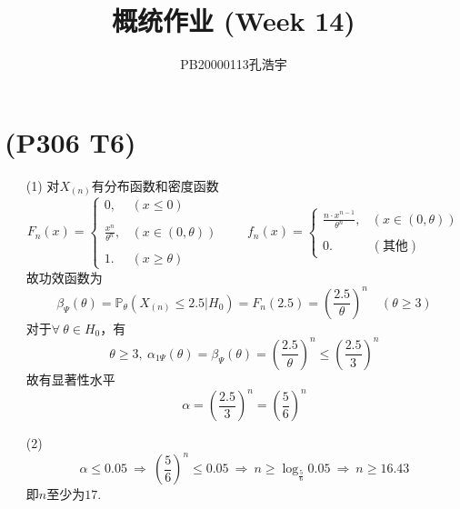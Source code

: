 \documentclass{article}
\title{概统作业 (Week 14)}
\author{PB20000113孔浩宇}
\begin{document}
\maketitle
\section{(P306 T6)}  %
\begin{enumerate}
    \item [(1)]对$X_{(n)}$有分布函数和密度函数
    \[
        F_{n} (x) = 
        \begin{cases}
            0 , & (x \leq 0)\\
            \\
            \displaystyle{\frac{x^n}{\theta^n}} , & (x\in (0,\theta))\\
            \\
            1 . & (x\geq \theta)
        \end{cases} 
        \qquad
        f_{n} (x) = 
        \begin{cases}
            \displaystyle{\frac{n\cdot x^{n-1}}{\theta^{n}}} , & (x\in (0 , \theta))\\
            \\
            0. & (\mbox{其他})
        \end{cases}    
    \]
    故功效函数为
    \[
        \beta_{\Psi }(\theta)
        = \mathbb{P}_{\theta} \left( X_{(n)} \leq 2.5 \big\vert H_{0} \right)  
        = F_{n} (2.5) 
        = {\left(\frac{2.5}{\theta}\right)}^{n}
        \quad (\theta \geq 3)
    \]
    对于$\forall\ \theta \in H_{0}$，有
    \[
        \theta \geq 3,\ 
        \alpha_{1 \Psi} (\theta) 
        = \beta_{\Psi} (\theta)
        = {\left(\frac{2.5}{\theta}\right)}^{n} 
        \leq {\left(\frac{2.5}{3}\right)}^{n} 
    \]
    故有显著性水平
    \[
        \alpha 
        = {\left(\frac{2.5}{3}\right)}^{n}
        = {\left(\frac{5}{6}\right)}^{n}
    \]
    \item [(2)]
    \[
        \alpha \leq 0.05
        \ \Rightarrow\ 
        {\left(\frac{5}{6}\right)}^{n} \leq 0.05
        \ \Rightarrow\ 
        n \geq \log_{\frac{5}{6}} 0.05
        \ \Rightarrow\ 
        n \geq 16.43
    \]
    即$n$至少为$17$.
\end{enumerate}
\end{document}
